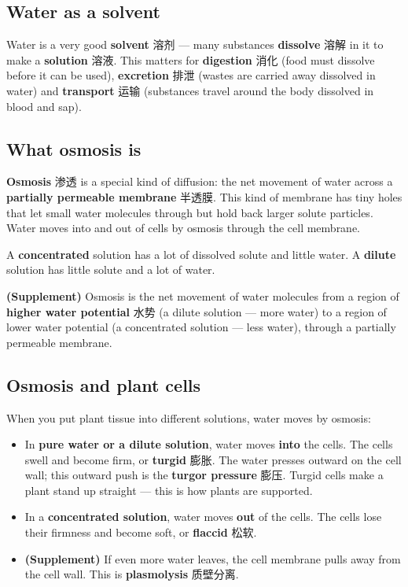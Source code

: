 \documentclass[11pt]{article}
\begin{document}
\subsection*{Water as a solvent}

Water is a very good \textbf{solvent} 溶剂 — many substances \textbf{dissolve} 溶解 in it to make a \textbf{solution} 溶液. This matters for \textbf{digestion} 消化 (food must dissolve before it can be used), \textbf{excretion} 排泄 (wastes are carried away dissolved in water) and \textbf{transport} 运输 (substances travel around the body dissolved in blood and sap).

\subsection*{What osmosis is}

\textbf{Osmosis} 渗透 is a special kind of diffusion: the net movement of water across a \textbf{partially permeable membrane} 半透膜. This kind of membrane has tiny holes that let small water molecules through but hold back larger solute particles. Water moves into and out of cells by osmosis through the cell membrane.

A \textbf{concentrated} solution has a lot of dissolved solute and little water. A \textbf{dilute} solution has little solute and a lot of water.

\textbf{(Supplement)} Osmosis is the net movement of water molecules from a region of \textbf{higher water potential} 水势 (a dilute solution — more water) to a region of lower water potential (a concentrated solution — less water), through a partially permeable membrane.

\subsection*{Osmosis and plant cells}

When you put plant tissue into different solutions, water moves by osmosis:

\begin{itemize}
\item In \textbf{pure water or a dilute solution}, water moves \textbf{into} the cells. The cells swell and become firm, or \textbf{turgid} 膨胀. The water presses outward on the cell wall; this outward push is the \textbf{turgor pressure} 膨压. Turgid cells make a plant stand up straight — this is how plants are supported.

\item In a \textbf{concentrated solution}, water moves \textbf{out} of the cells. The cells lose their firmness and become soft, or \textbf{flaccid} 松软.

\item \textbf{(Supplement)} If even more water leaves, the cell membrane pulls away from the cell wall. This is \textbf{plasmolysis} 质壁分离.

\end{itemize}
\end{document}
